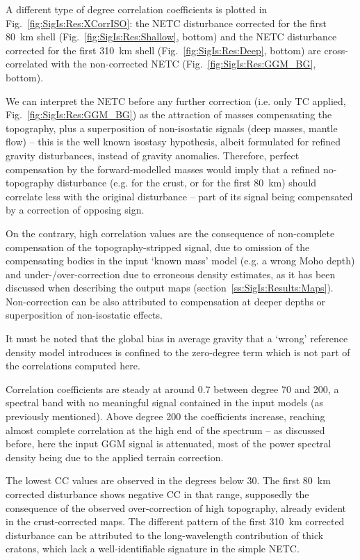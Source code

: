 A different type of degree correlation coefficients is plotted in Fig.~\ref{fig:SigIs:Res:XCorrISO}: the NETC disturbance corrected for the first \SI{80}{\kilo \metre} shell (Fig.~\ref{fig:SigIs:Res:Shallow}, bottom) and the NETC disturbance corrected for the first \SI{310}{\kilo \metre} shell (Fig.~\ref{fig:SigIs:Res:Deep}, bottom) are cross-correlated with the non-corrected NETC (Fig.~\ref{fig:SigIs:Res:GGM_BG}, bottom).

We can interpret the NETC before any further correction (i.e. only TC applied, Fig.~\ref{fig:SigIs:Res:GGM_BG}) as the attraction of masses compensating the topography, plus a superposition of non-isostatic signals (deep masses, mantle flow) -- this is the well known \parencite{VeningMeinesz1931} isostasy hypothesis, albeit formulated for refined gravity disturbances, instead of gravity anomalies.
Therefore, perfect compensation by the forward-modelled masses would imply that a refined no-topography disturbance (e.g. for the crust, or for the first \SI{80}{km}) should correlate less with the original disturbance -- part of its signal being compensated by a correction of opposing sign.

On the contrary, high correlation values are the consequence of non-complete compensation of the topography-stripped signal, due to omission of the compensating bodies in the input `known mass' model (e.g. a wrong Moho depth) and under-/over-correction due to erroneous density estimates, as it has been discussed when describing the output maps (section~\ref{ss:SigIs:Results:Maps}).
Non-correction can be also attributed to compensation at deeper depths or superposition of non-isostatic effects.

It must be noted that the global bias in average gravity that a `wrong' reference density model introduces is confined to the zero-degree term which is not part of the correlations computed here.

Correlation coefficients are steady at around \num[retain-explicit-plus]{+0.7} between degree \num{70} and \num{200}, a spectral band with no meaningful signal contained in the input models (as previously mentioned).
Above degree \num{200} the coefficients increase, reaching almost complete correlation at the high end of the spectrum -- as discussed before, here the input GGM signal is attenuated, most of the power spectral density being due to the applied terrain correction.

The lowest CC values are observed in the degrees below \num{30}.
The first \SI{80}{\kilo \metre} corrected disturbance shows negative CC in that range, supposedly the consequence of the observed over-correction of high topography, already evident in the crust-corrected maps.
The different pattern of the first \SI{310}{\kilo \metre} corrected disturbance can be attributed to the long-wavelength contribution of thick cratons, which lack a well-identifiable signature in the simple NETC.


